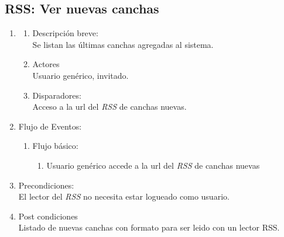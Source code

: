 \documentclass[a4paper,11pt]{article}
\begin{document}
\subsection{RSS: Ver nuevas canchas}
\begin{enumerate}

    \item
    \begin{enumerate}
        \item Descripción breve: \\
            Se listan las últimas canchas agregadas al sistema.
        \item Actores \\
            Usuario genérico, invitado.
        \item Disparadores: \\
            Acceso a la url del \emph{RSS} de canchas nuevas.
    \end{enumerate}

    \item Flujo de Eventos: 

        \begin{enumerate}
            \item Flujo básico:
        	\begin{enumerate}        
		\item 	Usuario genérico accede a la url del \emph{RSS} de canchas nuevas
	        \end{enumerate}
	\end{enumerate}

    \item Precondiciones: \\
        El lector del \emph{RSS} no necesita estar logueado como usuario.
    \item Post condiciones \\
        Listado de nuevas canchas con formato para ser leido con un lector RSS.

\end{enumerate}

\end{document}
